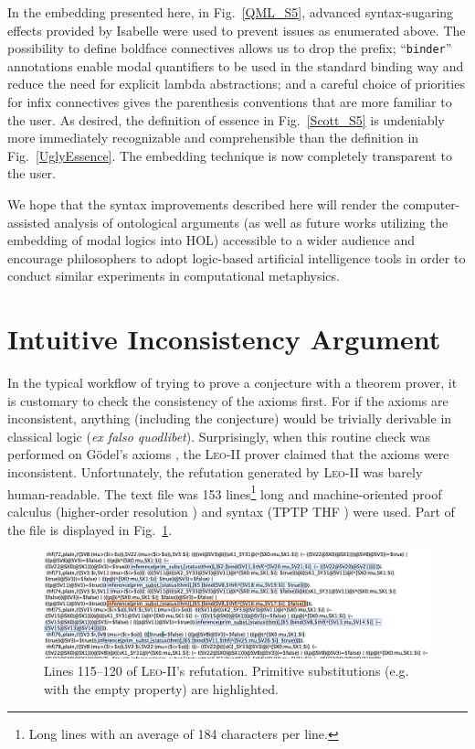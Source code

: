 \documentclass{article}
\begin{document}
In the embedding presented here, in Fig.~\ref{QML_S5}, advanced
syntax-sugaring effects provided by Isabelle were used to prevent
issues as enumerated above. The possibility to define boldface connectives allows us to drop the prefix; ``\texttt{binder}'' annotations enable modal quantifiers to be used in the standard binding way and reduce the need for explicit lambda abstractions; and a careful choice of priorities for infix connectives gives the parenthesis conventions that are more familiar to the user. As desired, the definition of essence in Fig.~\ref{Scott_S5} is undeniably more immediately recognizable and comprehensible than the definition in Fig.~\ref{UglyEssence}. The embedding technique is now completely transparent to the user.

We hope that the syntax improvements described here will render the computer-assisted analysis of ontological arguments (as well as future works utilizing the embedding of modal logics into HOL) accessible to a wider audience and encourage philosophers to adopt logic-based artificial intelligence tools in order to conduct similar experiments in computational metaphysics.


\section{Intuitive Inconsistency Argument} \label{sec:inconsistency}

In the typical workflow of trying to prove a conjecture with a theorem prover, it is customary to check the consistency of the axioms first. For if the axioms are inconsistent, anything (including the conjecture) would be trivially derivable in classical logic (\emph{ex falso quodlibet}). Surprisingly, when this routine check was performed on G\"odel's axioms \cite{C40}, the \textsc{Leo-II} prover claimed that the axioms were inconsistent. Unfortunately, the refutation generated by \textsc{Leo-II} was barely human-readable. The text file was 153 lines\footnote{Long lines with an average of 184 characters per line.} long and machine-oriented proof calculus (higher-order resolution \cite{W47}) and syntax (TPTP THF \cite{J22}) were used. Part of the file is displayed in Fig.~\ref{LEO-Proof}.

\begin{figure}
\centerline{\includegraphics[width=\textwidth]{./Images/LEO-Proof.png}}
\caption{Lines 115--120 of \textsc{Leo-II}'s refutation. Primitive
  substitutions (e.g. with the empty property) are highlighted.} \label{LEO-Proof}
\end{figure}
\end{document}
